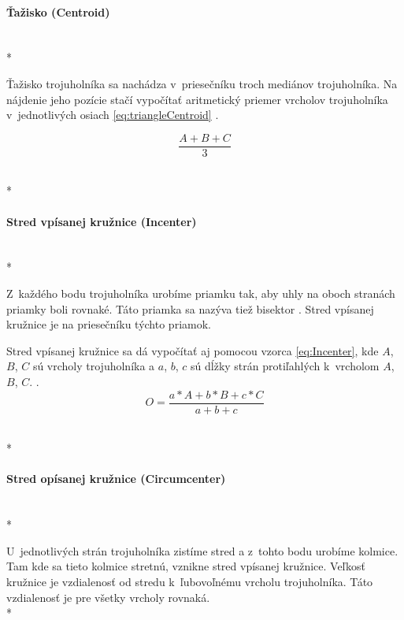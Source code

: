 \paragraph{Ťažisko (Centroid)}\unskip \mbox{} \\*

Ťažisko trojuholníka sa nachádza v~priesečníku troch mediánov trojuholníka. Na nájdenie jeho pozície stačí vypočítať aritmetický priemer vrcholov trojuholníka v~jednotlivých osiach \ref{eq:triangleCentroid} \cite{Centroid_of_a_Triangle}.



\begin{equation}
    \frac{A+B+C}{3}
    \label{eq:triangleCentroid}
\end{equation}

 \mbox{} \\*
\paragraph{Stred vpísanej kružnice (Incenter)}\unskip \mbox{} \\*
\label{sec:TriangleCenter}

Z~každého bodu trojuholníka urobíme priamku tak, aby uhly na oboch stranách priam\-ky boli rovnaké. Táto priamka sa nazýva tiež bisektor \cite{angle_bisector_theorem}. Stred vpísanej kružnice je na priesečníku týchto priamok.




Stred vpísanej kružnice sa dá vypočítať aj pomocou vzorca \ref{eq:Incenter}, kde  $A$, $B$, $C$ sú vrcholy trojuholníka a $a$, $b$, $c$ sú dĺžky strán protiľahlých k~vrcholom $A$, $B$, $C$. \cite{Incenter_page_2011}.
\begin{equation}
O = \frac{a\ast A+b\ast  B +c \ast C}{a + b + c}
    \label{eq:Incenter}
\end{equation}


 \mbox{} \\*
\paragraph{Stred opísanej kružnice (Circumcenter)}\unskip \mbox{} \\*

U~jednotlivých strán trojuholníka zistíme stred a z~tohto bodu urobíme kolmice. Tam kde sa tieto kolmice stretnú, vznikne stred vpísanej kružnice. Veľkosť kružnice je vzdialenosť od stredu k~ľubovoľnému vrcholu trojuholníka. Táto vzdialenosť je pre všetky vrcholy rovnaká.
 \mbox{} \\*

